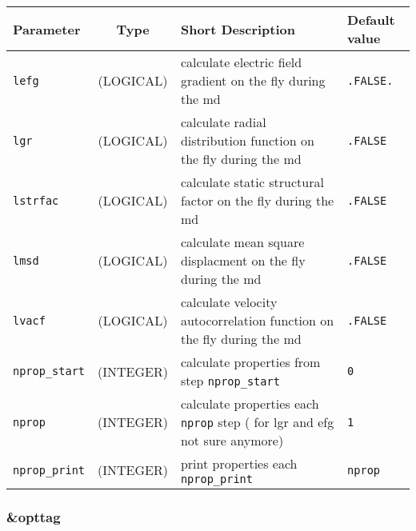 \documentclass[a4paper]{article}
\begin{document}
\begin{longtable}{l|c|m{8cm}|m{2cm}}
\hline
\hline
Parameter          &  Type              &          Short Description                                                          & Default value \\
\hline
\hline
\rule[-0.75cm]{0cm}{1.5cm}
\verb?lefg?        & (LOGICAL)          & calculate electric field gradient on the fly during the md                          & \verb?.FALSE.? \\
\hline
\rule[-0.75cm]{0cm}{1.5cm}
\verb?lgr?         & (LOGICAL)          & calculate radial distribution function on the fly during the md                     & \verb?.FALSE? \\
\hline
\rule[-0.75cm]{0cm}{1.5cm}
\verb?lstrfac?     & (LOGICAL)          & calculate static structural factor on the fly during the md                         & \verb?.FALSE? \\
\hline
\rule[-0.75cm]{0cm}{1.5cm}
\verb?lmsd?        & (LOGICAL)          & calculate mean square displacment on the fly during the md                          & \verb?.FALSE? \\
\hline
\rule[-0.75cm]{0cm}{1.5cm}
\verb?lvacf?       & (LOGICAL)          & calculate velocity autocorrelation function on the fly during the md                & \verb?.FALSE? \\
\hline
\rule[-0.75cm]{0cm}{1.5cm}
\verb?nprop_start? & (INTEGER)          & calculate properties from step \verb?nprop_start?                                   & \verb?0? \\
\hline
\rule[-0.75cm]{0cm}{1.5cm}
\verb?nprop?       & (INTEGER)          & calculate properties each \verb?nprop? step ( for lgr and efg not sure anymore)     & \verb?1? \\
\hline
\rule[-0.75cm]{0cm}{1.5cm}
\verb?nprop_print? & (INTEGER)          & print properties each \verb?nprop_print?                                            & \verb?nprop? \\
\hline
\hline
\end{longtable}

\subsubsection{\&opttag}
\end{document}
